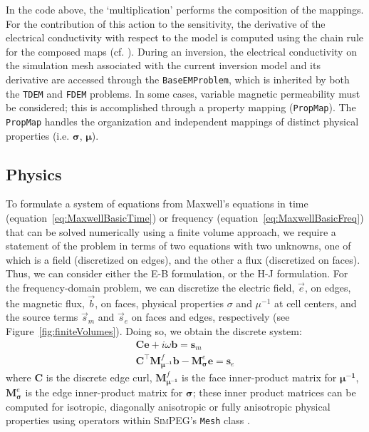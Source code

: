 \documentclass[preprint,review,3p,times,onecolumn,authoryear]{elsarticle}
\newcommand{\SimPEG}{\textsc{SimPEG}\xspace}
\newcommand{\Mesh}{\texttt{Mesh}\xspace}
\newcommand{\PropMap}{\texttt{PropMap}\xspace}
\newcommand{\TDEM}{\texttt{TDEM}\xspace}
\newcommand{\FDEM}{\texttt{FDEM}\xspace}
\newcommand{\sm}{\mathbf{s}_m}
\newcommand{\se}{\mathbf{s}_e}
\newcommand{\dcurl}{{\mathbf C}}
\newcommand{\M}{{\mathbf M}}
\newcommand{\MfMui}{{\M^f_{\boldsymbol{\mu^{-1}}}}}
\newcommand{\MeSigma}{{\M^e_{\boldsymbol{\sigma}}}}
\newcommand{\mui}{\mu^{-1}}
\begin{document}
In the code above, the `multiplication' performs the composition of the
mappings. For the contribution of this action to the sensitivity, the
derivative of the electrical conductivity with respect to the model is
computed using the chain rule for the composed maps (cf. \cite{Kang2015,
Heagy2014a}). During an inversion, the electrical conductivity on the
simulation mesh associated with the current inversion model and its derivative
are accessed through the \texttt{BaseEMProblem}, which is inherited by both
the \TDEM and \FDEM problems. In some cases, variable magnetic permeability
must be considered; this is accomplished through a property mapping
(\PropMap). The \PropMap handles the organization and independent mappings of
distinct physical properties (i.e. $\boldsymbol{\sigma}$, $\boldsymbol{\mu}$).



\subsection{Physics}
\label{sec:Physics}


To formulate a system of equations from Maxwell's equations in time
(equation~\ref{eq:MaxwellBasicTime}) or frequency
(equation~\ref{eq:MaxwellBasicFreq}) that can be solved numerically using a
finite volume approach, we require a statement of the problem in terms of two
equations with two unknowns, one of which is a field (discretized on edges),
and the other a flux (discretized on faces). Thus, we can consider either the
E-B formulation, or the H-J formulation. For the frequency-domain problem, we
can discretize the electric field, $\vec{e}$, on edges, the magnetic flux,
$\vec{b}$, on faces, physical properties $\sigma$ and $\mu^{-1}$ at cell
centers, and the source terms $\vec{s}_m$ and $\vec{s}_e$ on faces and edges,
respectively (see Figure~\ref{fig:finiteVolumes}). Doing so, we obtain the
discrete system:
\begin{equation}
    \begin{split}
        \dcurl \mathbf{e} + i\omega\mathbf{b} = \sm \\
        \dcurl^\top \MfMui \mathbf{b} - \MeSigma \mathbf{e} = \se
    \end{split}
    \label{eq:EB_FDEM}
\end{equation}
where $\dcurl$ is the discrete edge curl, $\MfMui$ is the face inner-product
matrix for $\boldsymbol{\mui}$, $\MeSigma$ is the edge inner-product matrix
for $\boldsymbol{\sigma}$; these inner product matrices can be computed for
isotropic, diagonally anisotropic or fully anisotropic physical properties
using operators within \SimPEG's \Mesh class \citep{Cockett2015, FV_Tutorial}.
\end{document}
